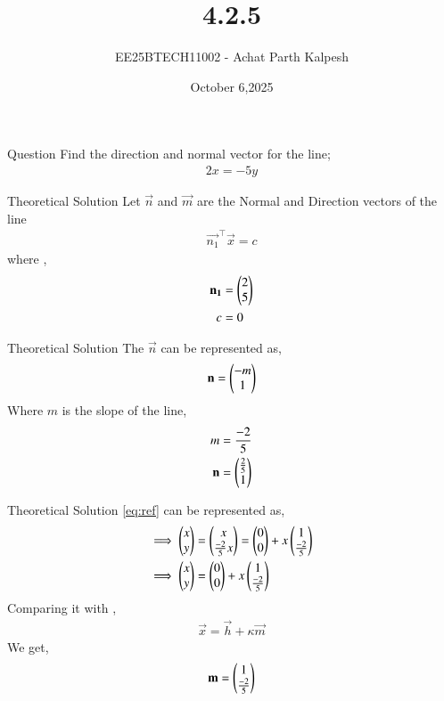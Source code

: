 \documentclass{beamer}
\title %
{4.2.5}
\date{October 6,2025}
\author %
{EE25BTECH11002 - Achat Parth Kalpesh}
\begin{document}
\frame{\titlepage}

\begin{frame}{Question}
Find the direction and normal vector for the line;
\begin{align}
    2x=-5y
    \label{eq:ref}
\end{align}
\end{frame}

\begin{frame}{Theoretical Solution}
Let $\vec{n}$ and $\vec{m}$ are the Normal and Direction vectors of the 
line
\begin{align}
    \vec{n_1}^\top\vec{x}=c
\end{align}
where ,
\begin{align}
    \mathbf{n_1} &= \begin{pmatrix}2 \\ 5\end{pmatrix}\\
    c &= 0
\end{align}

\end{frame}

\begin{frame}{Theoretical Solution}
The $\vec{n}$ can be represented as,
\begin{align}
    \mathbf{n} = \begin{pmatrix}-m \\ 1\end{pmatrix}
\end{align}
Where $m$ is the slope of the line,
\begin{align}
    m &= \frac{-2}{5}\\
    \mathbf{n} &= \begin{pmatrix}\frac{2}{5} \\ 1\end{pmatrix}
\end{align}

\end{frame}

\begin{frame}{Theoretical Solution}
\eqref{eq:ref} can be represented as,
\begin{align}
    \implies \begin{pmatrix}x \\ y\end{pmatrix} &= \begin{pmatrix}x \\ \frac{-2}{5}x\end{pmatrix} =\begin{pmatrix}0 \\ 0\end{pmatrix} + x\begin{pmatrix}1 \\ \frac{-2}{5}\end{pmatrix}\\
    \implies \begin{pmatrix}x \\ y\end{pmatrix} &=\begin{pmatrix}0 \\ 0\end{pmatrix} + x\begin{pmatrix}1 \\ \frac{-2}{5}\end{pmatrix}
\end{align}
Comparing it with ,
\begin{align}
\label{eq:geo-param}
	\vec{x} = \vec{h} + \kappa \vec{m}
\end{align}
We get,
\begin{align}
			\label{eq:line-school-dir}
\mathbf{m} = \begin{pmatrix}1 \\ \frac{-2}{5}\end{pmatrix}
\end{align}
\end{frame}
\end{document}
